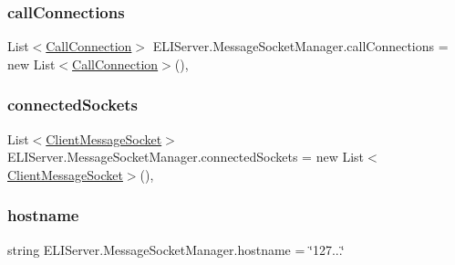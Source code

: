 \subsubsection{\texorpdfstring{call\+Connections}{callConnections}}
{\footnotesize\ttfamily List$<$\hyperlink{class_e_l_i_server_1_1_call_connection}{Call\+Connection}$>$ E\+L\+I\+Server.\+Message\+Socket\+Manager.\+call\+Connections = new List$<$\hyperlink{class_e_l_i_server_1_1_call_connection}{Call\+Connection}$>$()\hspace{0.3cm}{\ttfamily [static]}, {\ttfamily [private]}}

\mbox{\label{class_e_l_i_server_1_1_message_socket_manager_a042e9dc087484feacc3128eb3f7ac2f4}} 
\subsubsection{\texorpdfstring{connected\+Sockets}{connectedSockets}}
{\footnotesize\ttfamily List$<$\hyperlink{class_e_l_i_server_1_1_messaging_1_1_client_message_socket}{Client\+Message\+Socket}$>$ E\+L\+I\+Server.\+Message\+Socket\+Manager.\+connected\+Sockets = new List$<$\hyperlink{class_e_l_i_server_1_1_messaging_1_1_client_message_socket}{Client\+Message\+Socket}$>$()\hspace{0.3cm}{\ttfamily [static]}, {\ttfamily [private]}}

\mbox{\label{class_e_l_i_server_1_1_message_socket_manager_afe7ddcd6b733f389617621037d713db4}} 
\subsubsection{\texorpdfstring{hostname}{hostname}}
{\footnotesize\ttfamily string E\+L\+I\+Server.\+Message\+Socket\+Manager.\+hostname = \char`\"{}127...\char`\"{}\hspace{0.3cm}{\ttfamily [private]}}

